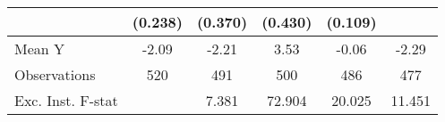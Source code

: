 {\begin{tabular}{l*{5}{c}}
            &     (0.238)         &     (0.370)         &     (0.430)         &     (0.109)         &                     \\
\midrule
Mean Y      &       -2.09         &       -2.21         &        3.53         &       -0.06         &       -2.29         \\
Observations&         520         &         491         &         500         &         486         &         477         \\
Exc. Inst. F-stat&                     &       7.381         &      72.904         &      20.025         &      11.451         \\
\bottomrule
\end{tabular}
}
